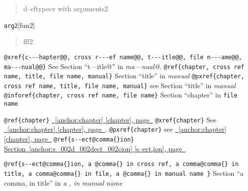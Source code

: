 \documentclass{book}
\begin{document}
%
\begin{quote}
\unskip{\parskip=0pt\noindent}%
d--eftypecv with arguments2
\end{quote}

\noindent\texttt{arg2}\hfill[fun2]



%
\begin{quote}
\unskip{\parskip=0pt\noindent}%
fff2
\end{quote}


\texttt{@xref\{c{-}{-}{-}hapter@@, cross r{-}{-}{-}ef name@@, t{-}{-}{-}itle@@, file n{-}{-}{-}ame@@, ma{-}{-}{-}nual@@\}} See Section ``t---itle@'' in \textsl{ma---nual@}.
\texttt{@ref\{chapter, cross ref name, title, file name, manual\}} Section ``title'' in \textsl{manual}
\texttt{@pxref\{chapter, cross ref name, title, file name, manual\}} see Section ``title'' in \textsl{manual}
\texttt{@inforef\{chapter, cross ref name, file name\}} Section ``chapter'' in \texttt{file name}

\texttt{@ref\{chapter\}} \hyperref[anchor:chapter]{\chaptername~\ref*{anchor:chapter} [chapter], page~\pageref*{anchor:chapter}}
\texttt{@xref\{chapter\}} See \hyperref[anchor:chapter]{\chaptername~\ref*{anchor:chapter} [chapter], page~\pageref*{anchor:chapter}}.
\texttt{@pxref\{chapter\}} see \hyperref[anchor:chapter]{\chaptername~\ref*{anchor:chapter} [chapter], page~\pageref*{anchor:chapter}}
\texttt{@ref\{s{-}{-}ect@comma\{\}ion\}} \hyperref[anchor:s_002d_002dect_002cion]{Section~\ref*{anchor:s_002d_002dect_002cion} [s--ect,ion], page~\pageref*{anchor:s_002d_002dect_002cion}}

\texttt{@ref\{s{-}{-}ect@comma\{\}ion, a @comma\{\} in cross
ref, a comma@comma\{\} in title, a comma@comma\{\} in file, a @comma\{\} in manual name \}}
Section ``a comma, in title'' in \textsl{a , in manual name}
\end{document}
